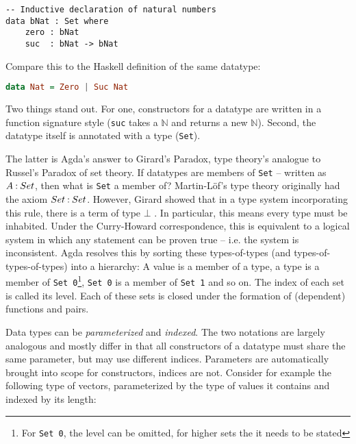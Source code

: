 \begin{lstlisting}[caption={Definition of a type representing the natural numbers},label={lst:tutorial:datatypes},emph={zero,suc}]
-- Inductive declaration of natural numbers
data bNat : Set where
    zero : bNat
    suc  : bNat -> bNat
\end{lstlisting}

Compare this to the Haskell definition of the same datatype:

\noindent\begin{minipage}{\linewidth}
\begin{lstlisting}[caption={Peano numbers in Haskell},label={lst:haskell:peano},language=haskell,emph={Zero,Suc}]
data Nat = Zero | Suc Nat
\end{lstlisting}
\end{minipage}


Two things stand out. For one, constructors for a datatype are written in a function signature style (\texttt{suc} takes a \texttt{$\mathbb N$} and returns a new \texttt{$\mathbb N$}). Second, the datatype itself is annotated with a type (\texttt{Set}).

The latter is Agda's answer to Girard's Paradox, type theory's analogue to Russel's Paradox of set theory. If datatypes are members of \texttt{Set} -- written as $A \mathbin{:} Set$, then what is \texttt{Set} a member of? Martin-Löf's type theory originally had the axiom $Set \mathbin{:} Set$. However, Girard showed that in a type system incorporating this rule, there is a term of type $\bot$ \cite{girard:1972:interpretation-fonctionelle}. In particular, this means every type must be inhabited. Under the Curry-Howard correspondence, this is equivalent to a logical system in which any statement can be proven true -- i.e. the system is inconsistent. Agda resolves this by sorting these types-of-types (and types-of-types-of-types) into a hierarchy: A value is a member of a type, a type is a member of \texttt{Set 0}\footnote{For \texttt{Set 0}, the level can be omitted, for higher sets the it needs to be stated}, \texttt{Set 0} is a member of \texttt{Set 1} and so on. The index of each set is called its level. Each of these sets is closed under the formation of (dependent) functions and pairs.

Data types can be \emph{parameterized} and \emph{indexed}. The two notations are largely analogous and mostly differ in that all constructors of a datatype must share the same parameter, but may use different indices. Parameters are automatically brought into scope for constructors, indices are not. Consider for example the following type of vectors, parameterized by the type of values it contains and indexed by its length:

